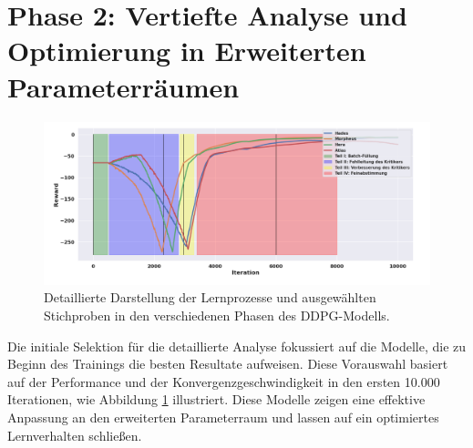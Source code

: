 
\section{Phase 2: Vertiefte Analyse und Optimierung in Erweiterten Parameterräumen}
\label{subsec:Detailed_Learning_Process_Phase2}




\begin{figure}[htbp]
\centering
\includegraphics[width=\textwidth]{4Ergebnisse/Phasen/2Phase/4_0Presentation_of_Phase.png.png}
\caption{Detaillierte Darstellung der Lernprozesse und ausgewählten Stichproben in den verschiedenen Phasen des DDPG-Modells.}
\label{fig:ddpg-learning-phases}
\end{figure}

 Die initiale Selektion für die detaillierte Analyse fokussiert auf die Modelle, die zu Beginn des Trainings die besten Resultate aufweisen. Diese Vorauswahl basiert auf der Performance und der Konvergenzgeschwindigkeit in den ersten 10.000 Iterationen, wie Abbildung \ref{fig:ddpg-learning-phases} illustriert. Diese Modelle zeigen eine effektive Anpassung an den erweiterten Parameterraum und lassen auf ein optimiertes Lernverhalten schließen.








